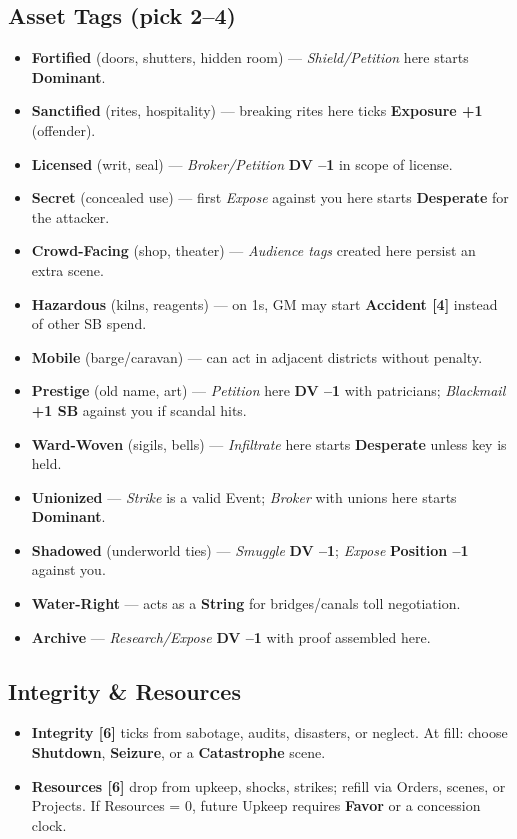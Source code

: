 \documentclass[11pt]{article}
\begin{document}
\subsection{Asset Tags (pick 2--4)}
\begin{itemize}
  \item \textbf{Fortified} (doors, shutters, hidden room) --- \emph{Shield/Petition} here starts \textbf{Dominant}.
  \item \textbf{Sanctified} (rites, hospitality) --- breaking rites here ticks \textbf{Exposure +1} (offender).
  \item \textbf{Licensed} (writ, seal) --- \emph{Broker/Petition} \textbf{DV --1} in scope of license.
  \item \textbf{Secret} (concealed use) --- first \emph{Expose} against you here starts \textbf{Desperate} for the attacker.
  \item \textbf{Crowd-Facing} (shop, theater) --- \emph{Audience tags} created here persist an extra scene.
  \item \textbf{Hazardous} (kilns, reagents) --- on 1s, GM may start \textbf{Accident [4]} instead of other SB spend.
  \item \textbf{Mobile} (barge/caravan) --- can act in adjacent districts without penalty.
  \item \textbf{Prestige} (old name, art) --- \emph{Petition} here \textbf{DV --1} with patricians; \emph{Blackmail} \textbf{+1 SB} against you if scandal hits.
  \item \textbf{Ward-Woven} (sigils, bells) --- \emph{Infiltrate} here starts \textbf{Desperate} unless key is held.
  \item \textbf{Unionized} --- \emph{Strike} is a valid Event; \emph{Broker} with unions here starts \textbf{Dominant}.
  \item \textbf{Shadowed} (underworld ties) --- \emph{Smuggle} \textbf{DV --1}; \emph{Expose} \textbf{Position --1} against you.
  \item \textbf{Water-Right} --- acts as a \textbf{String} for bridges/canals toll negotiation.
  \item \textbf{Archive} --- \emph{Research/Expose} \textbf{DV --1} with proof assembled here.
\end{itemize}

\subsection{Integrity \& Resources}
\begin{itemize}
  \item \textbf{Integrity [6]} ticks from sabotage, audits, disasters, or neglect. At fill: choose \textbf{Shutdown}, \textbf{Seizure}, or a \textbf{Catastrophe} scene.
  \item \textbf{Resources [6]} drop from upkeep, shocks, strikes; refill via Orders, scenes, or Projects. If Resources = 0, future Upkeep requires \textbf{Favor} or a concession clock.
\end{itemize}
\end{document}
